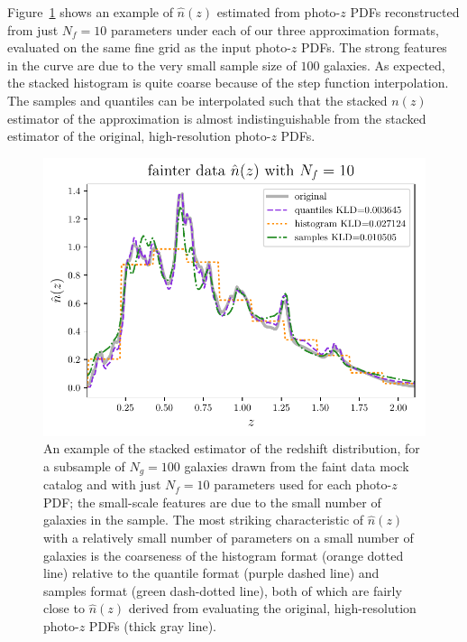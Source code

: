 \documentclass[\docopts]{\docclass}
\newcommand{\pz}{photo-$z$ PDF}
\newcommand{\ssdata}{faint\xspace}
\begin{document}
Figure~\ref{fig:stacked} shows an example of $\hat{n}(z)$ estimated from \pz s 
reconstructed from just $N_{f}=10$ parameters under each of our three 
approximation formats, evaluated on the same fine grid as the input \pz s.
The strong features in the curve are due to the very small sample size of $100$ 
galaxies.
As expected, the stacked histogram is quite coarse because of the step function 
interpolation.
The samples and quantiles can be interpolated such that the stacked $n(z)$ 
estimator of the approximation is almost indistinguishable from the stacked 
estimator of the original, high-resolution \pz s.


\begin{figure}
  \begin{center}
    \includegraphics[width=\columnwidth]{figures/stacked.pdf}
    \caption{An example of the stacked estimator of the redshift distribution, 
for a subsample of $N_{g}=100$ galaxies drawn from the \ssdata data mock 
catalog and with just $N_{f}=10$ parameters used for each \pz; the small-scale 
features are due to the small number of galaxies in the sample.
    The most striking characteristic of $\hat{n}(z)$ with a relatively small 
number of parameters on a small number of galaxies is the coarseness of the 
histogram format (orange dotted line) relative to the quantile format (purple 
dashed line) and samples format (green dash-dotted line), both of which are 
fairly close to $\hat{n}(z)$ derived from evaluating the original, 
high-resolution \pz s (thick gray line).
    \label{fig:stacked}}
  \end{center}
\end{figure}
\end{document}

